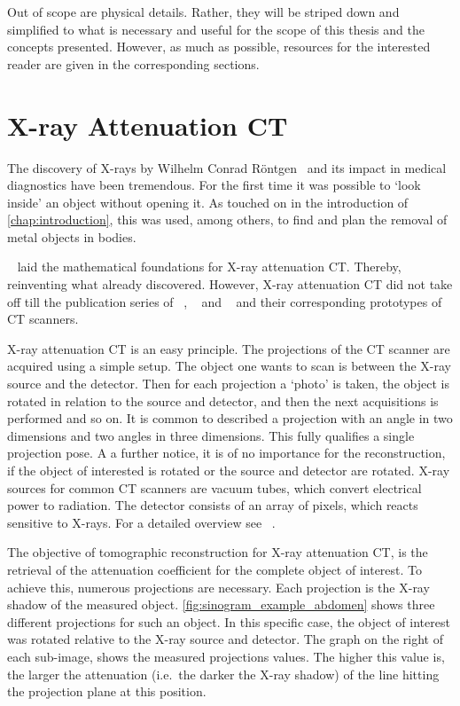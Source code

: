 Out of scope are physical details. Rather, they will be striped down and simplified to what is
necessary and useful for the scope of this thesis and the concepts presented. However, as much as
possible, resources for the interested reader are given in the corresponding sections.

\section{X-ray Attenuation CT}\label{sec:xray_attenuation_ct}

The discovery of X-rays by Wilhelm Conrad Röntgen~\cite{rontgen_uber_1895} and its impact in medical
diagnostics have been tremendous. For the first time it was possible to `look inside' an object
without opening it. As touched on in the introduction of \autoref{chap:introduction}, this was used,
among others, to find and plan the removal of metal objects in bodies.

\citeauthor*{cormack_representation_1963}~\cite{cormack_representation_1963} laid the mathematical
foundations for X-ray attenuation CT\@. Thereby, reinventing what \citeauthor*{radon_uber_1917}
already discovered. However, X-ray attenuation CT did not take off till the publication series of
\citeauthor*{hounsfield_computerized_1973}~\cite{hounsfield_computerized_1973},
\citeauthor*{ambrose_computerized_1973}~\cite{ambrose_computerized_1973} and
\citeauthor*{perry_computerized_1973}~\cite{perry_computerized_1973} and their corresponding
prototypes of CT scanners.

X-ray attenuation CT is an easy principle. The projections of the CT scanner are acquired using a
simple setup. The object one wants to scan is between the X-ray source and the detector. Then for
each projection a `photo' is taken, the object is rotated in relation to the source and detector,
and then the next acquisitions is performed and so on. It is common to described a projection with
an angle in two dimensions and two angles in three dimensions. This fully qualifies a single
projection pose. A a further notice, it is of no importance for the reconstruction, if the object of
interested is rotated or the source and detector are rotated. X-ray sources for common CT scanners
are vacuum tubes, which convert electrical power to radiation. The detector consists of an array of
pixels, which reacts sensitive to X-rays. For a detailed overview see
\citeauthor{buzug_computed_2008}~\cite[Chapter~2]{buzug_computed_2008}.

The objective of tomographic reconstruction for X-ray attenuation CT, is the retrieval of the
attenuation coefficient for the complete object of interest. To achieve this, numerous projections
are necessary. Each projection is the X-ray shadow of the measured object.
\autoref{fig:sinogram_example_abdomen} shows three different projections for such an object. In this
specific case, the object of interest was rotated relative to the X-ray source and detector. The
graph on the right of each sub-image, shows the measured projections values. The higher this value
is, the larger the attenuation (i.e.\ the darker the X-ray shadow) of the line hitting the
projection plane at this position.


